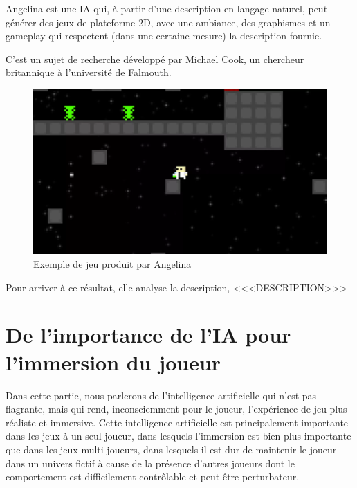\documentclass[a4paper, 12pt]{article} %
\begin{document}
Angelina est une IA qui, à partir d’une description en langage naturel, peut générer des jeux de plateforme 2D, avec une ambiance, des graphismes et un gameplay qui respectent (dans une certaine mesure) la description fournie.

C’est un sujet de recherche développé par Michael Cook, un chercheur britannique à l’université de Falmouth.

\begin{figure}[!h]%
	\begin{center} 
		\includegraphics[width=0.60\columnwidth]{images/angelina.png}%
		\caption{Exemple de jeu produit par Angelina}%
	\end{center}
\end{figure}

Pour arriver à ce résultat, elle analyse la description, <<<DESCRIPTION>>>


\newpage
\section{De l’importance de l’IA pour l’immersion du joueur}

Dans cette partie, nous parlerons de l’intelligence artificielle qui n’est pas flagrante, mais qui rend, inconsciemment pour le joueur, l'expérience de jeu plus réaliste et immersive. Cette intelligence artificielle est principalement importante dans les jeux à un seul joueur, dans lesquels l’immersion est bien plus importante que dans les jeux multi-joueurs, dans lesquels il est dur de maintenir le joueur dans un univers fictif à cause de la présence d’autres joueurs dont le comportement est difficilement contrôlable et peut être perturbateur.
\end{document}
